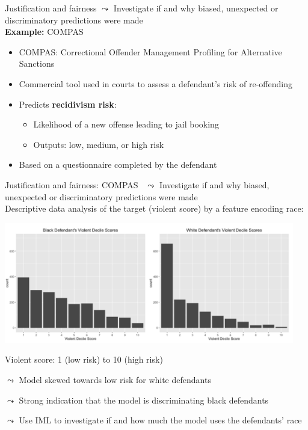 \documentclass[11pt,compress,t,notes=noshow, aspectratio=169, xcolor=table]{beamer}
\begin{document}
\begin{frame}{Justification and fairness}
    $\leadsto$ Investigate if and why biased, unexpected or discriminatory predictions were made \\
    \bigskip
    \textbf{Example:} COMPAS
    \smallskip
    \begin{itemize}
        \item COMPAS: Correctional Offender Management Profiling for Alternative Sanctions
    \item Commercial tool used in courts to assess a defendant’s risk of re-offending

    \item Predicts \textbf{recidivism risk}:
    \begin{itemize}
        \item Likelihood of a new offense leading to jail booking
        \item Outputs: low, medium, or high risk
    \end{itemize}
    \item Based on a questionnaire completed by the defendant
    \end{itemize}

\end{frame}

\begin{frame}{Justification and fairness: COMPAS~}
    $\leadsto$ Investigate if and why biased, unexpected or discriminatory predictions were made \\
    \medskip
    Descriptive data analysis of the target (violent score) by a feature encoding race: 
    
    \centering
    \includegraphics[width=0.95\textwidth]{figure/compass_black_white.PNG}

    Violent score: 1 (low risk) to 10 (high risk)

    \medskip
    \raggedright
	$\leadsto$ Model skewed towards low risk for white defendants
	
	$\leadsto$ Strong indication that the model is discriminating black defendants
	
	$\leadsto$ Use IML to investigate if and how much the model uses the defendants' race
\end{frame}
\end{document}
